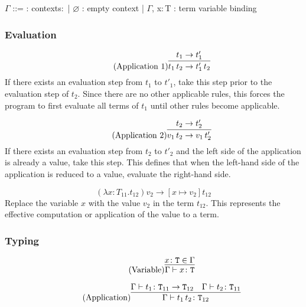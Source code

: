 \begin{bnfgrammar}
    $\Gamma$ ::= : contexts$\colon$
    | $\varnothing$ : empty context
    | $\Gamma$, x$\colon$T : term variable binding
\end{bnfgrammar}\leavevmode\newline

\subsubsection{Evaluation}
\begin{equation*}
    \tag{Application 1}
    \infer{
        t_1\,t_2 \rightarrow t'_1\,t_2
    }{
        t_1 \rightarrow t'_1
    }
\end{equation*}
If there exists an evaluation step from $t_1$ to $t'_1$, take this step
prior to the evaluation step of $t_2$. Since there are no other applicable rules,
this forces the program to first evaluate all terms of $t_1$ until other rules become
applicable.

\begin{equation*}
    \tag{Application 2}
    \infer{
        v_1\,t_2 \rightarrow v_1\,t'_2
    }{
        t_2 \rightarrow t'_2
    }
\end{equation*}
If there exists an evaluation step from $t_2$ to $t'_2$ and the left
side of the application is already a value, take this step. This defines
that when the left-hand side of the application is reduced to a value, evaluate
the right-hand side.

\begin{equation*}
    \tag{Application Abstraction}
    (\lambda x \colon T_{11} . t_{12}) v_2 \rightarrow [x \mapsto v_2] t_{12}
\end{equation*}
Replace the variable $x$ with the value $v_2$ in the term $t_{12}$. This represents
the effective computation or application of the value to a term.

\subsubsection{Typing}
\begin{equation*}
    \tag{Variable}
    \infer{
        \Gamma \vdash x \colon \texttt{T}
    }{
        x \colon \texttt{T} \in \Gamma
    }
\end{equation*}

\begin{equation*}
    \tag{Application}
    \infer{
        \Gamma \vdash t_1\,t_2 \colon \texttt{T}_{12}
    }{
        \Gamma \vdash t_1 \colon \texttt{T}_{11} \rightarrow \texttt{T}_{12}
        &
        \Gamma \vdash t_2 \colon \texttt{T}_{11}
    }
\end{equation*}

